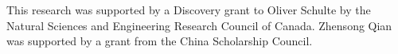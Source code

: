 \documentclass{vldb}
\begin{document}
This research was supported by a Discovery grant to Oliver Schulte by the Natural Sciences and Engineering Research Council of Canada. 
Zhensong Qian was supported by a grant from the China Scholarship Council.



 




%
%
%
%
\end{document}
